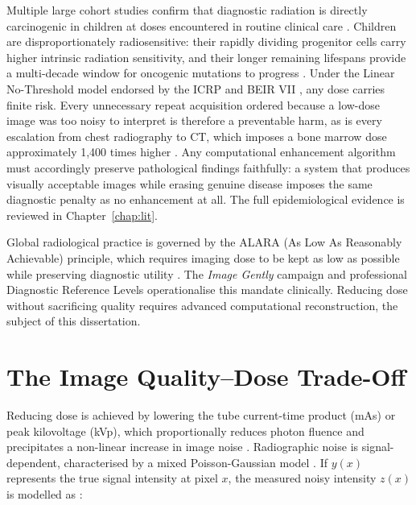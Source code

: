 \documentclass[12pt, a4paper, twoside, openright]{book}
\begin{document}
Multiple large cohort studies confirm that diagnostic radiation is directly carcinogenic in children at doses encountered in routine clinical care \cite{mathews_cancer_2013, hauptmann_brain_2023, bosch_de_basea_gomez_risk_2023, smith-bindman_hematologic_2025}. Children are disproportionately radiosensitive: their rapidly dividing progenitor cells carry higher intrinsic radiation sensitivity, and their longer remaining lifespans provide a multi-decade window for oncogenic mutations to progress \cite{national_research_council_health_2006, pearce_radiation_2012}. Under the Linear No-Threshold model endorsed by the ICRP and BEIR VII \cite{international_commission_on_radiological_protection_2007_2007, national_research_council_health_2006}, any dose carries finite risk. Every unnecessary repeat acquisition ordered because a low-dose image was too noisy to interpret is therefore a preventable harm, as is every escalation from chest radiography to CT, which imposes a bone marrow dose approximately 1,400 times higher \cite{smith-bindman_hematologic_2025}. Any computational enhancement algorithm must accordingly preserve pathological findings faithfully: a system that produces visually acceptable images while erasing genuine disease imposes the same diagnostic penalty as no enhancement at all. The full epidemiological evidence is reviewed in Chapter~\ref{chap:lit}.

Global radiological practice is governed by the ALARA (As Low As Reasonably Achievable) principle, which requires imaging dose to be kept as low as possible while preserving diagnostic utility \cite{international_commission_on_radiological_protection_2007_2007}. The \textit{Image Gently} campaign \cite{strauss_image_2009} and professional Diagnostic Reference Levels operationalise this mandate clinically. Reducing dose without sacrificing quality requires advanced computational reconstruction, the subject of this dissertation.

\section{The Image Quality--Dose Trade-Off}
\label{sec:intro:tradeoff}

Reducing dose is achieved by lowering the tube current-time product (mAs) or peak kilovoltage (kVp), which proportionally reduces photon fluence and precipitates a non-linear increase in image noise \cite{borges_noise_2020}. Radiographic noise is signal-dependent, characterised by a mixed Poisson-Gaussian model \cite{foi_practical_2008, borges_noise_2020}. If $y(x)$ represents the true signal intensity at pixel $x$, the measured noisy intensity $z(x)$ is modelled as \cite{foi_practical_2008}:
\end{document}
